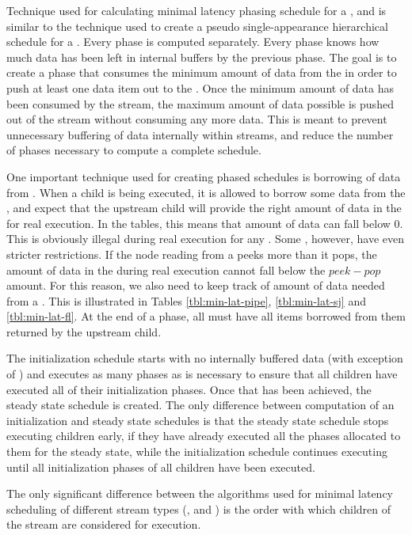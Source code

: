 Technique used for calculating minimal latency phasing schedule
for a {\pipeline}, {\splitjoin} and {\feedbackloop} is similar to the
technique used to create a pseudo single-appearance hierarchical
schedule for a {\feedbackloop}. Every phase is computed separately.
Every phase knows how much data has been left in internal buffers
by the previous phase.  The goal is to create a phase that
consumes the minimum amount of data from the {\Input} {{\Channel}} in
order to push at least one data item out to the {\Output} {{\Channel}}.
Once the minimum amount of data has been consumed by the stream,
the maximum amount of data possible is pushed out of the stream
without consuming any more data. This is meant to prevent
unnecessary buffering of data internally within streams, and
reduce the number of phases necessary to compute a complete
schedule.

One important technique used for creating phased schedules is
borrowing of data from {\Channels}.  When a child is being executed,
it is allowed to borrow some data from the {\Channel}, and expect
that the upstream child will provide the right amount of data in
the {\Channel} for real execution. In the tables, this means that
amount of data can fall below 0. This is obviously illegal during
real execution for any {\Channel}. Some {\Channels}, however, have
even stricter restrictions. If the node reading from a {\Channel}
peeks more than it pops, the amount of data in the {\Channel} during
real execution cannot fall below the $peek-pop$ amount. For this
reason, we also need to keep track of amount of data needed from a
{\Channel}. This is illustrated in Tables \ref{tbl:min-lat-pipe},
\ref{tbl:min-lat-sj} and \ref{tbl:min-lat-fl}. At the end of a
phase, all {\Channels} must have all items borrowed from them
returned by the upstream child.

The initialization schedule starts with no internally buffered
data (with exception of {\feedbackloops}) and executes as many
phases as is necessary to ensure that all children have executed
all of their initialization phases. Once that has been achieved,
the steady state schedule is created. The only difference between
computation of an initialization and steady state schedules is
that the steady state schedule stops executing children early, if
they have already executed all the phases allocated to them for
the steady state, while the initialization schedule continues
executing until all initialization phases of all children have
been executed.

The only significant difference between the algorithms used for
minimal latency scheduling of different stream types ({\pipeline},
{\splitjoin} and {\feedbackloop}) is the order with which children of
the stream are considered for execution.

